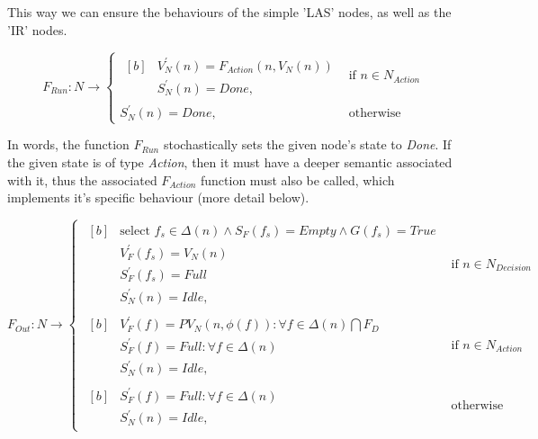 \begin{definition}
This way we can ensure the behaviours of the simple 'LAS' nodes, as well as the 'IR' nodes.

\begin{equation}
	F_{Run} : N \rightarrow
	\begin{cases}
		\begin{aligned}[b]
			&V_N^\prime(n) = F_{Action}(n, V_N(n)) \\
			&S_N^\prime(n) = \mathit{Done},
		\end{aligned} & \text{if } n \in N_{Action} \\[8pt]
		S_N^\prime(n) = \mathit{Done}, & \text{otherwise}
	\end{cases}
\end{equation}

In words, the function \(F_{Run}\) stochastically sets the given node's state to \emph{Done}. If the given state is of type \emph{Action}, then it must have a deeper semantic associated with it, thus the associated \(F_{Action}\) function must also be called, which implements it's specific behaviour (more detail below).

\begin{equation}
	F_{Out} : N \rightarrow
	\begin{cases}
		\begin{aligned}[b]
			&\text{select } f_s \in \Delta(n) \wedge S_F(f_s) = \mathit{Empty} \wedge G(f_s) = \mathit{True} \\
			&V_F^\prime(f_s) = V_N(n) \\
			&S_F^\prime(f_s) = \mathit{Full} \\
			&S_N^\prime(n) = \mathit{Idle},
		\end{aligned} & \text{if } n \in N_\mathit{Decision} \\[8pt]
		\begin{aligned}[b]
			&V_F^\prime(f) = \mathit{PV}_N(n, \phi(f)) : \forall f \in \Delta(n) \bigcap F_D \\
			&S_F^\prime(f) = \mathit{Full} : \forall f \in \Delta(n) \\
			&S_N^\prime(n) = \mathit{Idle},
		\end{aligned} & \text{if } n \in N_\mathit{Action} \\[8pt]
		\begin{aligned}[b]
			&S_F^\prime(f) = \mathit{Full} : \forall f \in \Delta(n) \\
			&S_N^\prime(n) = \mathit{Idle},
		\end{aligned} & \text{otherwise}
	\end{cases}
\end{equation}


\end{definition}
